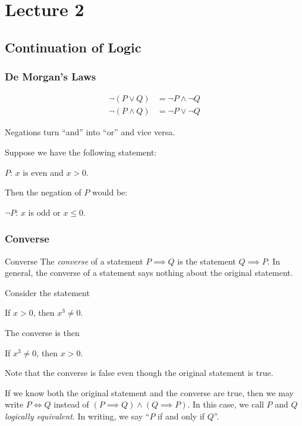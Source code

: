 \documentclass[class=article, crop=false]{standalone}
\begin{document}
  \section{Lecture 2}
  \subsection{Continuation of Logic}
  \subsubsection{De Morgan's Laws}
  \begin{align*}
    \neg(P\lor Q) &= \neg P \land \neg Q \\
    \neg(P\land Q) &= \neg P \lor \neg Q
  \end{align*}
  \begin{note}{}
    Negations turn ``and'' into ``or'' and vice versa.
  \end{note}
  \begin{example}{}
    Suppose we have the following statement:
    \begin{center}
      $P$: $x$ is even and $x > 0$.
    \end{center}
    Then the negation of $P$ would be:
    \begin{center}
      $\neg P$: $x$ is odd or $x\leq 0$.
    \end{center}
  \end{example}
  \subsubsection{Converse}
  \begin{definition}{Converse}
    The \emph{converse} of a statement $P\implies Q$ is the statement $Q\implies P$. In general, the converse of a statement says nothing about the original statement.
  \end{definition}
  \begin{example}{}
    Consider the statement
    \begin{center}
      If $x > 0$, then $x^3\neq 0$.
    \end{center}
    The converse is then
    \begin{center}
      If $x^3 \neq 0$, then $x > 0$.
    \end{center}
    Note that the converse is false even though the original statement is true.
  \end{example}
  If we know both the original statement and the converse are true, then we may write $P\iff Q$ instead of $(P\implies Q)\land (Q\implies P)$. In this case, we call $P$ and $Q$ \emph{logically equivalent}. In writing, we say ``$P$ if and only if $Q$''.
\end{document}
